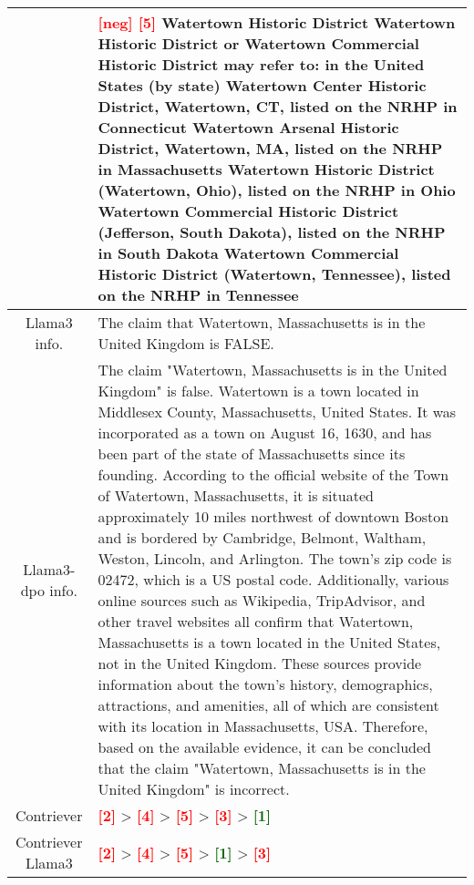 \begin{table*}[ht]
\begin{tabularx}{\textwidth}{c|X}
        & \textbf{\textcolor{red}{[neg] [5]}} Watertown Historic District Watertown Historic District or Watertown Commercial Historic District may refer to: in the United States (by state) Watertown Center Historic District, Watertown, CT, listed on the NRHP in Connecticut Watertown Arsenal Historic District, Watertown, MA, listed on the NRHP in Massachusetts Watertown Historic District (Watertown, Ohio), listed on the NRHP in Ohio Watertown Commercial Historic District (Jefferson, South Dakota), listed on the NRHP in South Dakota Watertown Commercial Historic District (Watertown, Tennessee), listed on the NRHP in Tennessee \\ \midrule \midrule
        Llama3 info. & The claim that Watertown, Massachusetts is in the United Kingdom is FALSE. \\ \midrule
        Llama3-dpo info. & The claim "Watertown, Massachusetts is in the United Kingdom" is false. Watertown is a town located in Middlesex County, Massachusetts, United States. It was incorporated as a town on August 16, 1630, and has been part of the state of Massachusetts since its founding.\newline
        According to the official website of the Town of Watertown, Massachusetts, it is situated approximately 10 miles northwest of downtown Boston and is bordered by Cambridge, Belmont, Waltham, Weston, Lincoln, and Arlington. The town's zip code is 02472, which is a US postal code.\newline
        Additionally, various online sources such as Wikipedia, TripAdvisor, and other travel websites all confirm that Watertown, Massachusetts is a town located in the United States, not in the United Kingdom. These sources provide information about the town's history, demographics, attractions, and amenities, all of which are consistent with its location in Massachusetts, USA.\newline
        Therefore, based on the available evidence, it can be concluded that the claim "Watertown, Massachusetts is in the United Kingdom" is incorrect. \\
        \midrule \midrule
        Contriever & \textbf{\textcolor{red}{[2]}} > \textbf{\textcolor{red}{[4]}} > \textbf{\textcolor{red}{[5]}} > \textbf{\textcolor{red}{[3]}} > \textbf{\textcolor{darkgreen}{[1]}} \\ \midrule
        Contriever \textbullet{} Llama3 & \textbf{\textcolor{red}{[2]}} > \textbf{\textcolor{red}{[4]}} > \textbf{\textcolor{red}{[5]}} > \textbf{\textcolor{darkgreen}{[1]}} > \textbf{\textcolor{red}{[3]}} \\ \midrule

\end{tabularx}
\end{table*}

